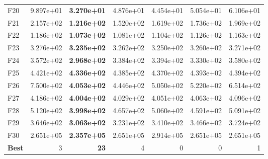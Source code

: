 \begin{tabular}{lrrrrrr}
F20 & 9.897e+01 & \textbf{3.270e+01} & 4.876e+01 & 4.454e+01 & 5.054e+01 & 6.106e+01 \\
F21 & 2.157e+02 & \textbf{1.216e+02} & 1.520e+02 & 1.619e+02 & 1.736e+02 & 1.969e+02 \\
F22 & 1.186e+02 & \textbf{1.073e+02} & 1.081e+02 & 1.104e+02 & 1.126e+02 & 1.163e+02 \\
F23 & 3.276e+02 & \textbf{3.235e+02} & 3.262e+02 & 3.250e+02 & 3.260e+02 & 3.271e+02 \\
F24 & 3.572e+02 & \textbf{2.968e+02} & 3.384e+02 & 3.394e+02 & 3.330e+02 & 3.580e+02 \\
F25 & 4.421e+02 & \textbf{4.336e+02} & 4.385e+02 & 4.370e+02 & 4.393e+02 & 4.394e+02 \\
F26 & 7.500e+02 & \textbf{4.053e+02} & 4.446e+02 & 5.050e+02 & 5.220e+02 & 6.514e+02 \\
F27 & 4.186e+02 & \textbf{4.004e+02} & 4.029e+02 & 4.051e+02 & 4.063e+02 & 4.096e+02 \\
F28 & 5.120e+02 & \textbf{3.998e+02} & 4.657e+02 & 5.060e+02 & 4.591e+02 & 5.091e+02 \\
F29 & 3.646e+02 & \textbf{3.063e+02} & 3.231e+02 & 3.410e+02 & 3.466e+02 & 3.724e+02 \\
F30 & 2.651e+05 & \textbf{2.357e+05} & 2.651e+05 & 2.914e+05 & 2.651e+05 & 2.651e+05 \\
\midrule
\textbf{Best} & 3 & \textbf{23} & 4 & 0 & 0 & 1 \\
\bottomrule
\end{tabular}